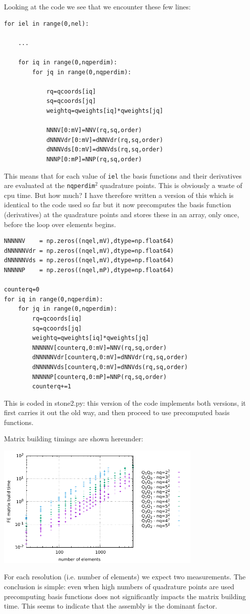 Looking at the code we see that we encounter these few lines:
\begin{lstlisting}
for iel in range(0,nel):

    ...

    for iq in range(0,nqperdim):
        for jq in range(0,nqperdim):

            rq=qcoords[iq]
            sq=qcoords[jq]
            weightq=qweights[iq]*qweights[jq]

            NNNV[0:mV]=NNV(rq,sq,order)
            dNNNVdr[0:mV]=dNNVdr(rq,sq,order)
            dNNNVds[0:mV]=dNNVds(rq,sq,order)
            NNNP[0:mP]=NNP(rq,sq,order)
\end{lstlisting}
This means that for each value of \lstinline{iel} the basis functions and 
their derivatives are evaluated at the \lstinline{nqperdim}$^2$ quadrature points. 
This is obviously a waste of cpu time. But how much? 
I have therefore written a version of this \stone which is identical to the code 
used so far but it now precomputes the basis function (derivatives) at the 
quadrature points and stores these in an array, only once, before the loop 
over elements begins.

\begin{lstlisting}
NNNNNV    = np.zeros((nqel,mV),dtype=np.float64)
dNNNNNVdr = np.zeros((nqel,mV),dtype=np.float64)
dNNNNNVds = np.zeros((nqel,mV),dtype=np.float64)
NNNNNP    = np.zeros((nqel,mP),dtype=np.float64)

counterq=0    
for iq in range(0,nqperdim):
    for jq in range(0,nqperdim):
        rq=qcoords[iq]
        sq=qcoords[jq]
        weightq=qweights[iq]*qweights[jq]
        NNNNNV[counterq,0:mV]=NNV(rq,sq,order)
        dNNNNNVdr[counterq,0:mV]=dNNVdr(rq,sq,order)
        dNNNNNVds[counterq,0:mV]=dNNVds(rq,sq,order)
        NNNNNP[counterq,0:mP]=NNP(rq,sq,order)
        counterq+=1
\end{lstlisting}

This is coded in stone2.py: this version of the code 
implements both versions, it first carries it out the old 
way, and then proceed to use precomputed basis functions.

Matrix building timings are shown hereunder:
\begin{center}
\includegraphics[width=10cm]{python_codes/fieldstone_48/results/timings/FEMbuildtimes.pdf}
\end{center}
For each resolution (i.e. number of elements) we expect two measurements. 
The conclusion is simple: even when high numbers of quadrature points are used 
precomputing basis functions does not
significantly impacts the matrix building time.
This seems to indicate that the assembly is the dominant factor.

 

